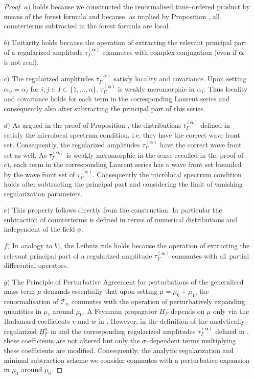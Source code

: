 \documentclass[11pt]{book}
\newcommand{\alphabd}{\boldsymbol{\alpha}}
\theoremstyle{break}
\begin{document}
\begin{proof}





$a)$ holds because we constructed the renormalised time--ordered product by means of the forest formula %
and because, as implied by Proposition %
, all counterterms subtracted in the forest formula are local.

$b)$ Unitarity holds because the operation of extracting the relevant principal part of a regularized amplitude $\tau^{(\alphabd)}_\Gamma$ commutes with complex conjugation (even if $\alphabd$ is not real).

$c)$ The regularized amplitudes $\tau^{(\alphabd)}_\Gamma$ satisfy locality and covariance. Upon setting $\alpha_{ij}=\alpha_I$ for $i,j\in I\subset \{1,\dots,n\}$, $\tau^{(\alphabd)}_\Gamma$ is weakly meromorphic in $\alpha_I$. Thus locality and covariance holds for each term in the corresponding Laurent series and consequently also after subtracting the principal part of this series.

$d)$ As argued in the proof of Proposition %
, the distributions $t^{(\alphabd)}_\Gamma$ defined in %
satisfy the microlocal spectrum condition, i.e. they have the correct wave front set. Consequently, the regularized amplitudes $\tau^{(\alphabd)}_\Gamma$ have the correct wave front set as well. As $\tau^{(\alphabd)}_\Gamma$ is weakly meromorphic in the sense recalled in the proof of $c)$, each term in the corresponding Laurent series has a wave front set bounded by the wave front set of $\tau^{(\alphabd)}_\Gamma$. Consequently the microlocal spectrum condition holds after subtracting the principal part and considering the limit of vanishing regularization parameters.

$e)$ This property follows directly from the construction. In particular the subtraction of counterterms is defined in terms of numerical distributions and independent of the field $\phi$.

$f)$ In analogy to $b)$, the Leibniz rule holds because the operation of extracting the relevant principal part of a regularized amplitude $\tau^{(\alphabd)}_\Gamma$ commutes with all partial differential operators.

$g)$ The Principle of Perturbative Agreement for perturbations of the generalised mass term $\mu$ demands essentially that upon setting $\mu=\mu_0 + \mu_1$, the renormalisation of $\mathcal{T}_n$ commutes with the operation of perturbatively expanding quantities in $\mu_1$ around $\mu_0$. A Feynman propagator $H_F$ depends on $\mu$ only via the Hadamard coefficients $v$ and $w$ in %
. However, in the definition of the analytically regularized $H^{\alpha}_F$ in %
and the corresponding regularized amplitudes $\tau^{(\alphabd)}_\Gamma$ defined in %
, these coefficients are not altered but only the $\sigma$--dependent terms multiplying these coefficients are modified. Consequently, the analytic regularization and minimal subtraction scheme we consider commutes with a perturbative expansion in $\mu_1$ around $\mu_0$.


\end{proof}
\end{document}
